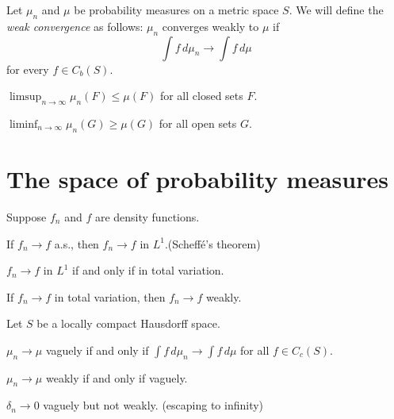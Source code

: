 \documentclass{../note}
\begin{document}



\begin{prb}
Let $\mu_n$ and $\mu$ be probability measures on a metric space $S$.
We will define the \emph{weak convergence} as follows: $\mu_n$ converges weakly to $\mu$ if
\[\int f\,d\mu_n\to\int f\,d\mu\]
for every $f\in C_b(S)$.
\begin{parts}
\item $\limsup_{n\to\infty}\mu_n(F)\le\mu(F)$ for all closed sets $F$.
\item $\liminf_{n\to\infty}\mu_n(G)\ge\mu(G)$ for all open sets $G$.
\end{parts}
\end{prb}


\begin{prb}
\end{prb}

\begin{prb}
\end{prb}

\begin{prb}
\end{prb}




\section{The space of probability measures}
\begin{prb}
Suppose $f_n$ and $f$ are density functions.
\begin{parts}
\item If $f_n\to f$ a.s., then $f_n\to f$ in $L^1$.\hfill(Scheff\'e's theorem)
\item $f_n\to f$ in $L^1$ if and only if in total variation.
\item If $f_n\to f$ in total variation, then $f_n\to f$ weakly.
\end{parts}
\end{prb}

\begin{prb}
Let $S$ be a locally compact Hausdorff space.
\begin{parts}
\item $\mu_n\to\mu$ vaguely if and only if $\int f\,d\mu_n\to\int f\,d\mu$ for all $f\in C_c(S)$.
\item $\mu_n\to\mu$ weakly if and only if vaguely.
\item $\delta_n\to0$ vaguely but not weakly. (escaping to infinity)
\end{parts}
\end{prb}
\begin{pf}
\end{pf}
\end{document}
